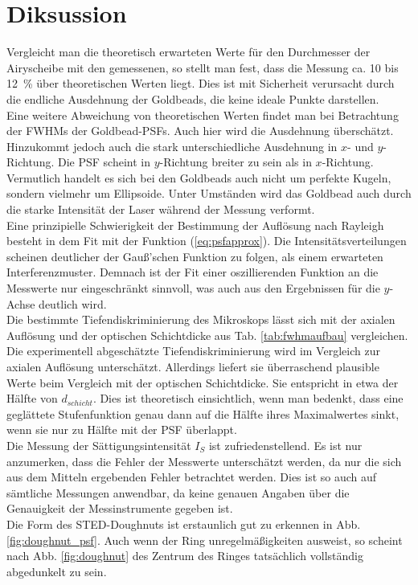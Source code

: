 \section{Diksussion}
Vergleicht man die theoretisch erwarteten Werte für den Durchmesser der Airyscheibe mit den gemessenen, so stellt man fest, dass die Messung ca. 10 bis 12~\% über theoretischen Werten liegt.
Dies ist mit Sicherheit verursacht durch die endliche Ausdehnung der Goldbeads, die keine ideale Punkte darstellen.
\\
Eine weitere Abweichung von theoretischen Werten findet man bei Betrachtung der FWHMs der Goldbead-PSFs. Auch hier wird die Ausdehnung überschätzt. 
Hinzukommt jedoch auch die stark unterschiedliche Ausdehnung in $x$- und $y$-Richtung. 
Die PSF scheint in $y$-Richtung breiter zu sein als in $x$-Richtung. 
Vermutlich handelt es sich bei den Goldbeads auch nicht um perfekte Kugeln, sondern vielmehr um Ellipsoide. Unter Umständen wird das Goldbead auch durch die starke Intensität der Laser während der Messung verformt.
\\
Eine prinzipielle Schwierigkeit der Bestimmung der Auflösung nach Rayleigh besteht in dem Fit mit der Funktion (\ref{eq:psfapprox}).
Die Intensitätsverteilungen scheinen deutlicher der Gauß'schen Funktion zu folgen, als einem erwarteten Interferenzmuster. 
Demnach ist der Fit einer oszillierenden Funktion an die Messwerte nur eingeschränkt sinnvoll, was auch aus den Ergebnissen für die $y$-Achse deutlich wird.
\\
Die bestimmte Tiefendiskriminierung des Mikroskops lässt sich mit der axialen Auflösung und der optischen Schichtdicke aus Tab. \ref{tab:fwhmaufbau} vergleichen. 
Die experimentell abgeschätzte Tiefendiskriminierung wird im Vergleich zur axialen Auflösung unterschätzt. 
Allerdings liefert sie überraschend plausible Werte beim Vergleich mit der optischen Schichtdicke.
Sie entspricht in etwa der Hälfte von $d_{schicht}$. Dies ist theoretisch einsichtlich, wenn man bedenkt, dass eine geglättete Stufenfunktion genau dann auf die Hälfte ihres Maximalwertes sinkt, wenn sie nur zu Hälfte mit der PSF überlappt. 
\\
Die Messung der Sättigungsintensität $I_S$ ist zufriedenstellend. Es ist nur anzumerken, dass die Fehler der Messwerte unterschätzt werden, da nur die sich aus dem Mitteln ergebenden Fehler betrachtet werden. 
Dies ist so auch auf sämtliche Messungen anwendbar, da keine genauen Angaben über die Genauigkeit der Messinstrumente gegeben ist.
\\
Die Form des STED-Doughnuts ist erstaunlich gut zu erkennen in Abb. \ref{fig:doughnut_psf}. Auch wenn der Ring unregelmäßigkeiten ausweist, so scheint nach Abb. \ref{fig:doughnut} des Zentrum des Ringes tatsächlich vollständig abgedunkelt zu sein.

